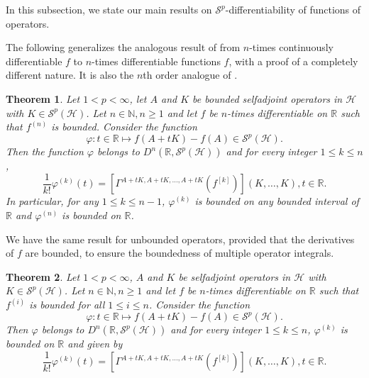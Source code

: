 \documentclass[12pt]{amsart}
\newtheorem{theorem}{Theorem}[section]
\theoremstyle{remark}
\renewcommand{\H}{\mbox{${\mathcal H}$}}
\newcommand{\N}{\mbox{${\mathbb N}$}}
\def\Sc{{\mathcal{S}}}
\begin{document}
In this subsection, we state our main results on $\mathcal{S}^p$-differentiability of functions of operators.

The following generalizes the analogous result of \cite[Theorem 3.7 (ii)]{LMS} from $n$-times continuously differentiable $f$ to $n$-times differentiable functions $f$, with a proof of a completely different nature. It is also the $n$th order analogue of \cite[7.13]{KPSS}.

\begin{theorem}\label{FormulaSA}
Let $1 < p < \infty$, let $A$ and $K$ be bounded selfadjoint operators in $\mathcal{H}$ with $K\in \mathcal{S}^p(\mathcal{H})$. Let $n \in\N, n\geq 1$ and let $f$ be $n$-times differentiable on $\mathbb{R}$ such that $f^{(n)}$ is bounded. Consider the function
$$\varphi : t\in \mathbb{R} \mapsto f(A+tK) - f(A) \in \mathcal{S}^p(\mathcal{H}).$$
Then the function $\varphi$ belongs to $D^n(\mathbb{R},\Sc^p(\H))$ and for every integer $1 \leq k \leq n$,
\begin{equation}\label{diffenrential}
\dfrac{1}{k!} \varphi^{(k)}(t) = \left[ \Gamma^{A+tK, A+tK, \ldots, A+tK}(f^{[k]}) \right] (K, \ldots, K), t\in \mathbb{R}.
\end{equation}
In particular, for any $1\leq k \leq n-1$, $\varphi^{(k)}$ is bounded on any bounded interval of $\mathbb{R}$ and $\varphi^{(n)}$ is bounded on $\mathbb{R}$.
\end{theorem}


We have the same result for unbounded operators, provided that the derivatives of $f$ are bounded, to ensure the boundedness of multiple operator integrals.


\begin{theorem}\label{FormulaSAunbdd}
Let $1 < p < \infty$, $A$ and $K$ be selfadjoint operators in $\mathcal{H}$ with $K\in \mathcal{S}^p(\mathcal{H})$. Let $n \in\N, n\geq 1$ and let $f$ be $n$-times differentiable on $\mathbb{R}$ such that $f^{(i)}$ is bounded for all $1\leq i \leq n$. Consider the function
\begin{equation}\label{defofvarphi}
\varphi : t\in \mathbb{R} \mapsto f(A+tK) - f(A) \in \mathcal{S}^p(\mathcal{H}).
\end{equation}
Then $\varphi$ belongs to $D^n(\mathbb{R},\Sc^p(\H))$ and for every integer $1 \leq k \leq n$, $\varphi^{(k)}$ is bounded on $\mathbb{R}$ and given by
\begin{equation}\label{diffenrentialunbdd}
\dfrac{1}{k!} \varphi^{(k)}(t) = \left[ \Gamma^{A+tK, A+tK, \ldots, A+tK}(f^{[k]}) \right] (K, \ldots, K), t\in \mathbb{R}.
\end{equation}
\end{theorem}
\end{document}
